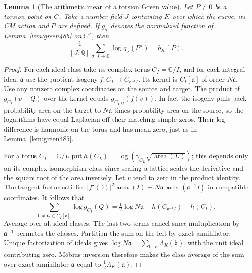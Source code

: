 \documentclass[a4paper,11pt]{article}
\newtheorem{lemma}[proposition]{Lemma}
\theoremstyle{definition}
\theoremstyle{remark}
\numberwithin{equation}{section}
\begin{document}
\begin{lemma}[The arithmetic mean of a torsion Green value]\leavevmode
\label{lem:cmorbit487}
Let \(P\ne0\) be a torsion point on \(C\). Take a number
field \(J\) containing \(K\) over which the curve, its CM action
and \(P\) are defined. If \(g_\sigma\) denotes the normalized
function of Lemma~\ref{lem:green486} on \(C^\sigma\), then
\[
      \frac{1}{[J:\mathbb Q]}\sum_{\sigma:J\hookrightarrow\mathbb C}
                \log g_\sigma(P^\sigma)=b_K(P).
\]
\end{lemma}
\begin{proof}
For each ideal class take its complex torus \(C_I=\mathbb C/I\),
and for each integral ideal \(\mathfrak a\) use the quotient
isogeny \(f:C_I\longrightarrow C_{\mathfrak a^{-1}I}\).
Its kernel is \(C_I[\mathfrak a]\) of order \(N\mathfrak a\).
Use any nonzero complex coordinates on the source and target.
The product of \(g_{C_I}(v+Q)\) over the kernel equals
\(g_{C_{\mathfrak a^{-1}I}}(f(v))\). In fact the isogeny
pulls back probability area on the target to \(N\mathfrak a\)
times probability area on the source, so the logarithms have
equal Laplacian off their matching simple zeros. Their log
difference is harmonic on the torus and has mean zero, just
as in Lemma~\ref{lem:green486}.

For a torus \(C_L=\mathbb C/L\) put
\(h(C_L)=\log(\gamma_{C_L}\sqrt{\operatorname{area}(L)})\);
this depends only on its complex isomorphism class since
scaling a lattice scales the derivative and the square root
of the area inversely. Let \(v\) tend to zero in the product
identity. The tangent factor satisfies
\(|f'(0)|^2\operatorname{area}(I)
       =N\mathfrak a\,\operatorname{area}(\mathfrak a^{-1}I)\)
in compatible coordinates. It follows that
\[
 \sum_{0\ne Q\in C_I[\mathfrak a]}\log g_{C_I}(Q)
       =\tfrac12\log N\mathfrak a
             + h(C_{\mathfrak a^{-1}I})-h(C_I).
\]
Average over all ideal classes. The last two terms cancel since
multiplication by \(\mathfrak a^{-1}\) permutes the classes.
Partition the sum on the left by exact annihilator. Unique
factorization of ideals gives
\(\log N\mathfrak a=\sum_{\mathfrak b\mid\mathfrak a}
\Lambda_K(\mathfrak b)\), with the unit ideal contributing zero.
M\"obius inversion therefore makes the class average of the sum
over exact annihilator \(\mathfrak a\) equal to
\(\tfrac12\Lambda_K(\mathfrak a)\).


\end{proof}
\end{document}
